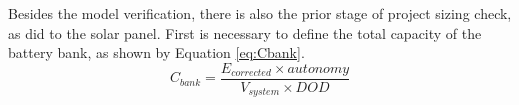 \documentclass[journal]{IEEEtran}
\begin{document}
%
%
%
%
%
%

%
%
Besides the model verification, there is also the prior stage of project sizing check, as did to the solar panel. First is necessary to define the total capacity of the battery bank, as shown by Equation \ref{eq:Cbank}.
\begin{equation}
\label{eq:Cbank}
C_{bank} = \dfrac{E_{corrected} \times autonomy}{V_{system} \times DOD}
\end{equation}
\end{document}
